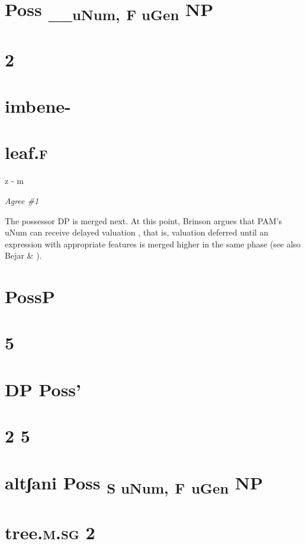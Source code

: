 \documentclass[output=paper
,modfonts
,nonflat]{langsci/langscibook}
\begin{document}
\section{       Poss \textsubscript{\_\_u}\textsubscript{Num,} \textsubscript{F u}\textsubscript{Gen}    NP}
\section{                          2}
\section{                         imbene-}
\section{                         leaf.\textsc{f}}

z {}- m

\textit{Agree \#1}

The possessor DP is merged next. At this point, Brinson argues that PAM's uNum can receive {\textquotedbl}delayed valuation{\textquotedbl} \citep{Carstens2016}, that is, valuation deferred until an expression with appropriate features is merged higher in the same phase (see also Bejar \& \citealt{Rezac2009}).

\section{           PossP}
\section{        5}
\section{      DP           Poss'}
\section{       2    5}
\section{       altʃani      Poss \textsubscript{S u}\textsubscript{Num}\textsubscript{,} \textsubscript{F}\textsubscript{ u}\textsubscript{Gen}\textsubscript{}    NP}
\section{       tree.\textsc{m.sg} 2}
\end{document}
